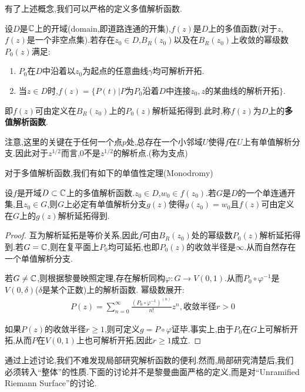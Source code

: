 有了上述概念,我们可以严格的定义多值解析函数.
\begin{definition}[多值解析函数]
	设$D$是$\mathbb{C}$上的开域(domain,即道路连通的开集),$f(z)$是$D$上的多值函数(对于$z$,$f(z)$是一个非空点集).若存在$z_0 \in D$,$B_R(z_0)$以及在$B_R(z_0)$上收敛的幂级数$P_0(z)$满足:
	\begin{enumerate}
		\item $P_0$在$D$中沿着以$z_0$为起点的任意曲线$\gamma$均可解析开拓.
		\item 当$z \in D$时,$f(z)=\{P(t)|P\text{为}P_0\text{沿着}D\text{中连接}z_0,z\text{的某曲线的解析开拓}\}$.
	\end{enumerate}
	
	即$f(z)$可由定义在$B_R(z_0)$上的$P_0(z)$解析延拓得到.此时,称$f(z)$为$D$上的\textbf{多值解析函数}.
\end{definition}

注意,这里的关键在于任何一个点$p$处,总存在一个小邻域$U$使得$f$在$U$上有单值解析分支.因此对于$z^{1/2}$而言,$0$不是$z^{1/2}$的解析点.(称为支点)

对于多值解析函数,我们有如下的单值性定理(Monodromy)
\begin{theorem}
	设$f$是开域$D \subset \mathbb{C}$上的多值解析函数.$z_0 \in D$,$w_0\in f(z_0)$.若$G$是$D$的一个单连通开集,且$z_0 \in G$,则$G$上必定有单值解析分支$g(z)$使得$g(z_0)=w_0$且$f(z)$可由定义在$G$上的$g(z)$解析延拓得到.
\end{theorem}
\begin{proof}
	互为解析延拓是等价关系,因此$f$可由$B_R(z_0)$处的幂级数$P_0(z)$解析延拓得到.若$G=\mathbb{C}$,则在复平面上$P_0$均可延拓,也即$P_0(z)$的收敛半径是$\infty$.从而自然存在一个单值解析分支.

   若$G \neq \mathbb{C}$,则根据黎曼映照定理,存在解析同构$\varphi:G \to V(0,1)$.从而$P_0 \circ \varphi^{-1}$是$V(0,\delta)$($\delta$是某个正数)上的解析函数.
   幂级数展开:
   \begin{align*}
	P(z)=\sum_{n=0}^\infty \frac{(P_0\circ \varphi^{-1})^{(n)}}{n!}z^n,\text{收敛半径}r>0
   \end{align*}

   如果$P(z)$的收敛半径$r \geq 1$,则可定义$g=P\circ \varphi$证毕.事实上,由于$P_0$在$G$上可解析开拓,从而$P$在$V(0,1)$上也可解析开拓,因此$r\geq 1$成立.
\end{proof}

通过上述讨论,我们不难发现局部研究解析函数的便利.然而,局部研究清楚后,我们必须转入“整体”的性质.下面的讨论并不是黎曼曲面严格的定义,而是对“Unramified Riemann Surface”的讨论.

